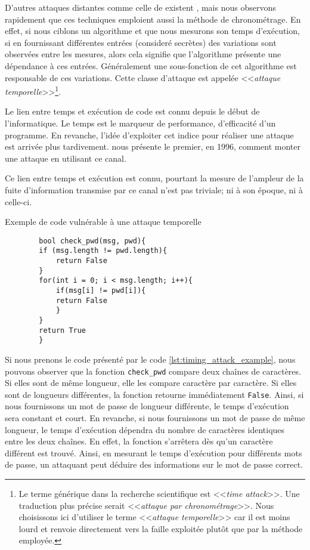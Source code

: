 D'autres attaques distantes comme celle de \citeauthor{LLC_attack} existent \cite{cryptoeprint:2016/224,Moghimi_2017,vanbulck2018nemesis}, mais nous observons rapidement que ces techniques emploient aussi la méthode de chronométrage. En effet, si nous ciblons un algorithme et que nous mesurons son temps d'exécution, si en fournissant différentes entrées (consideré secrètes) des variations sont observées entre les mesures, alors cela signifie que l'algorithme présente une dépendance à ces entrées. Généralement une sous-fonction de cet algorithme est responsable de ces variations. Cette classe d'attaque est appelée <<\textit{attaque temporelle}>>\footnote{Le terme générique dans la recherche scientifique est <<\textit{time attack}>>. Une traduction plus précise serait <<\textit{attaque par chronométrage}>>. Nous choisissons ici d'utiliser le terme <<\textit{attaque temporelle}>> car il est moins lourd et renvoie directement vers la faille exploitée plutôt que par la méthode employée.}.\medbreak

Le lien entre temps et exécution de code est connu depuis le début de l'informatique. Le temps est le marqueur de performance, d'efficacité d'un programme. En revanche, l'idée d'exploiter cet indice pour réaliser une attaque est arrivée plus tardivement. \citeauthor{crypto-1996-1469} nous présente le premier, en 1996, comment monter une attaque en utilisant ce canal.\medbreak

Ce lien entre temps et exécution est connu, pourtant la mesure de l'ampleur de la fuite d'information transmise par ce canal n'est pas triviale; ni à son époque, ni à celle-ci.

\begin{listing}[!ht]
    \caption{Exemple de code vulnérable à une attaque temporelle}
    \label{lst:timing_attack_example}
    \begin{verbatim}
        bool check_pwd(msg, pwd){
        if (msg.length != pwd.length){
            return False
        }
        for(int i = 0; i < msg.length; i++){
            if(msg[i] != pwd[i]){
            return False
            }
        }
        return True
        }
    \end{verbatim}
\end{listing}
                
Si nous prenons le code présenté par le code \ref{lst:timing_attack_example}, nous pouvons observer que la fonction \texttt{check\_pwd} compare deux chaînes de caractères. Si elles sont de même longueur, elle les compare caractère par caractère. Si elles sont de longueurs différentes, la fonction retourne immédiatement \texttt{False}. Ainsi, si nous fournissons un mot de passe de longueur différente, le temps d'exécution sera constant et court. En revanche, si nous fournissons un mot de passe de même longueur, le temps d'exécution dépendra du nombre de caractères identiques entre les deux chaînes. En effet, la fonction s'arrêtera dès qu'un caractère différent est trouvé. Ainsi, en mesurant le temps d'exécution pour différents mots de passe, un attaquant peut déduire des informations sur le mot de passe correct.\medbreak

